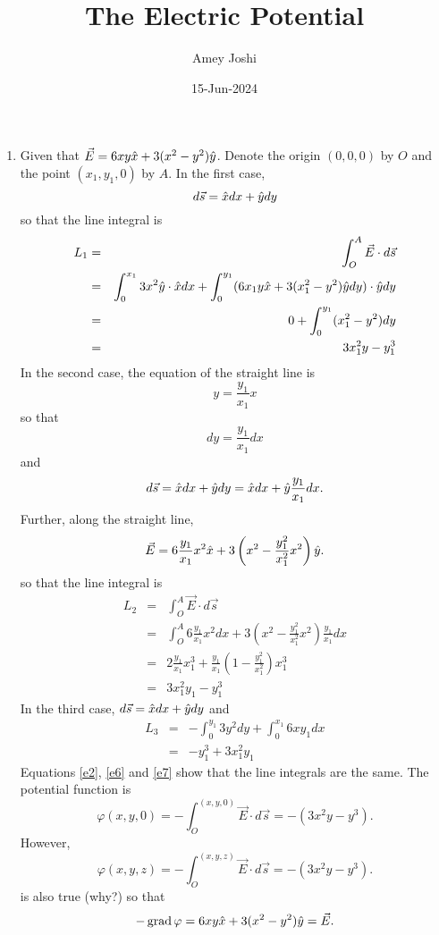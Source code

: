 \documentclass{article}
\begin{document}
\title{The Electric Potential}
\author{Amey Joshi}
\date{15-Jun-2024}
\maketitle
\begin{enumerate}
\item Given that $\vec{E} = 6xy\hat{x} + 3(x^2 - y^2)\hat{y}$. Denote the origin 
$(0,0,0)$ by $O$ and the point $(x_1, y_1, 0)$ by $A$. In the first case,
\begin{equation}\label{e1}
d\vec{s} = \hat{x}dx + \hat{y}dy
\end{equation}
so that the line integral is
\begin{eqnarray}
L_1 &=& \int_O^A\vec{E}\cdot d\vec{s} \nonumber \\
 &=& \int_0^{x_1}3x^2\hat{y}\cdot\hat{x}dx + 
     \int_0^{y_1}(6x_1y\hat{x} + 3(x_1^2 - y^2)\hat{y}dy)\cdot\hat{y}dy \nonumber \\
 &=& 0 + \int_0^{y_1}(x_1^2 - y^2)dy \nonumber \\
 &=& 3x_1^2y - y_1^3 \label{e2}
\end{eqnarray}
In the second case, the equation of the straight line is 
\begin{equation}\label{e3}
y = \frac{y_1}{x_1}x
\end{equation}
so that
\[
dy = \frac{y_1}{x_1}dx
\]
and
\begin{equation}\label{e4}
d\vec{s} = \hat{x}dx + \hat{y}dy = \hat{x}dx + \hat{y}\frac{y_1}{x_1}dx.
\end{equation}
Further, along the straight line,
\begin{equation}\label{e5}
\vec{E} = 6\frac{y_1}{x_1}x^2\hat{x} + 3\left(x^2 - \frac{y_1^2}{x_1^2}x^2\right)\hat{y}.
\end{equation}
so that the line integral is
\begin{eqnarray}
L_2 &=& \int_O^A\vec{E}\cdot d\vec{s} \nonumber \\
 &=& \int_O^A6\frac{y_1}{x_1}x^2dx + 
 3\left(x^2 - \frac{y_1^2}{x_1^2}x^2\right)\frac{y_1}{x_1}dx \nonumber \\
 &=& 2\frac{y_1}{x_1}x_1^3 + \frac{y_1}{x_1}\left(1 - \frac{y_1^2}{x_1^2}\right)x_1^3 \nonumber \\
 &=& 3x_1^2y_1 - y_1^3 \label{e6}
\end{eqnarray}
In the third case, $d\vec{s} = \hat{x}dx + \hat{y}dy$ and
\begin{eqnarray}
L_3 &=& -\int_0^{y_1}3y^2dy + \int_0^{x_1}6xy_1dx \nonumber \\
 &=& -y_1^3 + 3x_1^2y_1 \label{e7}
\end{eqnarray}
Equations \eqref{e2}, \eqref{e6} and \eqref{e7} show that the line integrals are
the same. The potential function is
\begin{equation}\label{e8}
\varphi(x, y, 0) = -\int_O^{(x, y, 0)}\vec{E}\cdot d\vec{s} = -(3x^2y - y^3).
\end{equation}
However,
\begin{equation}\label{e9}
\varphi(x, y, z) = -\int_O^{(x, y, z)}\vec{E}\cdot d\vec{s} = -(3x^2y - y^3).
\end{equation}
is also true (why?) so that
\[
-\operatorname{grad}\varphi = 6xy\hat{x} + 3(x^2-y^2)\hat{y} = \vec{E}.
\]


\end{enumerate}
\end{document}
